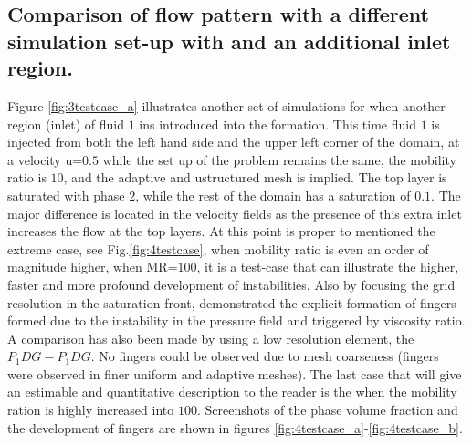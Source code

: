 \documentclass[preprint,authoryear,12pt]{elsarticle}
\begin{document}
\subsection{Comparison of flow pattern with a different simulation set-up with and an additional inlet region.}\label{section:results_dinlet}

\medskip
Figure \ref{fig:3testcase_a} illustrates another set of simulations for when another region (inlet) of fluid $1$ ins introduced into the formation. This time fluid $1$ is injected from both the left hand side and the upper left corner of the domain, at a velocity u=$0.5$ while the set up of the problem remains the same, the mobility ratio is $10$, and the adaptive and ustructured mesh is implied. The top layer is saturated with phase $2$, while the rest of the domain has a saturation of $0.1$. The major difference is located in the velocity fields %
as the presence of this extra inlet increases the flow at the top layers. At this point is proper to mentioned the extreme case, see Fig.\ref{fig:4testcase}, when mobility ratio is even an order of magnitude higher, when MR=$100$, 
it is a test-case that can illustrate the higher, faster and more profound development of instabilities. Also by focusing the grid resolution in the saturation front, \citet{christou_2015}  demonstrated the explicit formation of fingers formed due to the instability in the pressure ﬁeld and triggered by viscosity ratio. A comparison has also been made by using a low resolution element, the $P_{1}DG-P_{1}DG$. No fingers could be observed due to mesh coarseness (fingers were observed in ﬁner uniform and adaptive meshes). The last case that will give an estimable and quantitative description to the reader is the when the mobility ration is highly increased into $100$. Screenshots of the phase volume fraction and the development of fingers are shown in figures \ref{fig:4testcase_a}-\ref{fig:4testcase_b}.
\end{document}
